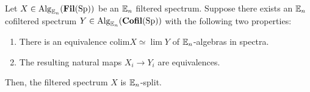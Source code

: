 \begin{thm}\label{thm:SplitMachine}%
Let $X\in \Alg_{\E_n}(\Fil(\Sp))$ be an $\E_n$ filtered spectrum.  Suppose there exists an $\E_n$ cofiltered spectrum $Y\in \Alg_{\E_n}(\Cofil(\Sp))$ with the following two properties:
\begin{enumerate}
\item There is an equivalence $\mathrm{colim } X \simeq \lim Y$ of $\E_n$-algebras in spectra.
\item The resulting natural maps $X_i \to Y_i$ are equivalences.  
\end{enumerate}
Then, the filtered spectrum $X$ is $\E_n$-split.
\end{thm}











